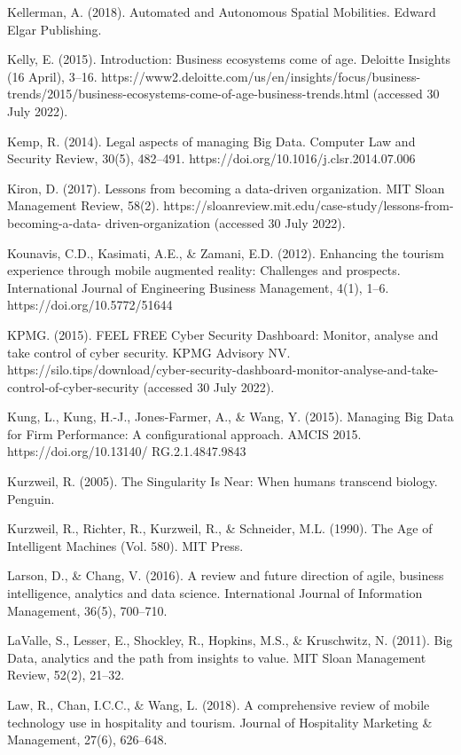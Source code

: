 \documentclass[
  letterpaper,
  DIV=11,
  numbers=noendperiod]{scrreprt}
\begin{document}
Kellerman, A. (2018). Automated and Autonomous Spatial Mobilities.
Edward Elgar Publishing.

Kelly, E. (2015). Introduction: Business ecosystems come of age.
Deloitte Insights (16 April), 3--16.
https://www2.deloitte.com/us/en/insights/focus/business-trends/2015/business-ecosystems-come-of-age-business-trends.html
(accessed 30 July 2022).

Kemp, R. (2014). Legal aspects of managing Big Data. Computer Law and
Security Review, 30(5), 482--491.
https://doi.org/10.1016/j.clsr.2014.07.006

Kiron, D. (2017). Lessons from becoming a data-driven organization. MIT
Sloan Management Review, 58(2).
https://sloanreview.mit.edu/case-study/lessons-from-becoming-a-data-
driven-organization (accessed 30 July 2022).

Kounavis, C.D., Kasimati, A.E., \& Zamani, E.D. (2012). Enhancing the
tourism experience through mobile augmented reality: Challenges and
prospects. International Journal of Engineering Business Management,
4(1), 1--6. https://doi.org/10.5772/51644

KPMG. (2015). FEEL FREE Cyber Security Dashboard: Monitor, analyse and
take control of cyber security. KPMG Advisory NV.
https://silo.tips/download/cyber-security-dashboard-monitor-analyse-and-take-control-of-cyber-security
(accessed 30 July 2022).

Kung, L., Kung, H.-J., Jones-Farmer, A., \& Wang, Y. (2015). Managing
Big Data for Firm Performance: A configurational approach. AMCIS 2015.
https://doi.org/10.13140/ RG.2.1.4847.9843

Kurzweil, R. (2005). The Singularity Is Near: When humans transcend
biology. Penguin.

Kurzweil, R., Richter, R., Kurzweil, R., \& Schneider, M.L. (1990). The
Age of Intelligent Machines (Vol. 580). MIT Press.

Larson, D., \& Chang, V. (2016). A review and future direction of agile,
business intelligence, analytics and data science. International Journal
of Information Management, 36(5), 700--710.

LaValle, S., Lesser, E., Shockley, R., Hopkins, M.S., \& Kruschwitz, N.
(2011). Big Data, analytics and the path from insights to value. MIT
Sloan Management Review, 52(2), 21--32.

Law, R., Chan, I.C.C., \& Wang, L. (2018). A comprehensive review of
mobile technology use in hospitality and tourism. Journal of Hospitality
Marketing \& Management, 27(6), 626--648.
\end{document}
